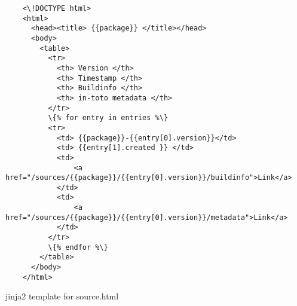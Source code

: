 \documentclass[Main/thesis.tex]{subfiles}
\begin{document}
\begin{listing}[H]
\begin{verbatim}
    <\!DOCTYPE html>
    <html>
      <head><title> {{package}} </title></head>
      <body>
        <table>
          <tr>
            <th> Version </th>
            <th> Timestamp </th>
            <th> Buildinfo </th>
            <th> in-toto metadata </th>
          </tr>
          \{% for entry in entries %\}
          <tr>
            <td> {{package}}-{{entry[0].version}}</td>
            <td> {{entry[1].created }} </td>
            <td> 
                <a href="/sources/{{package}}/{{entry[0].version}}/buildinfo">Link</a>
            </td>
            <td> 
                <a href="/sources/{{package}}/{{entry[0].version}}/metadata">Link</a>
            </td>
          </tr>
          \{% endfor %\}
        </table>
      </body>
    </html>
\end{verbatim}
\caption{jinja2 template for source.html}
\label{lst:jinja-source}
\end{listing}
\blankpage
\end{document}
